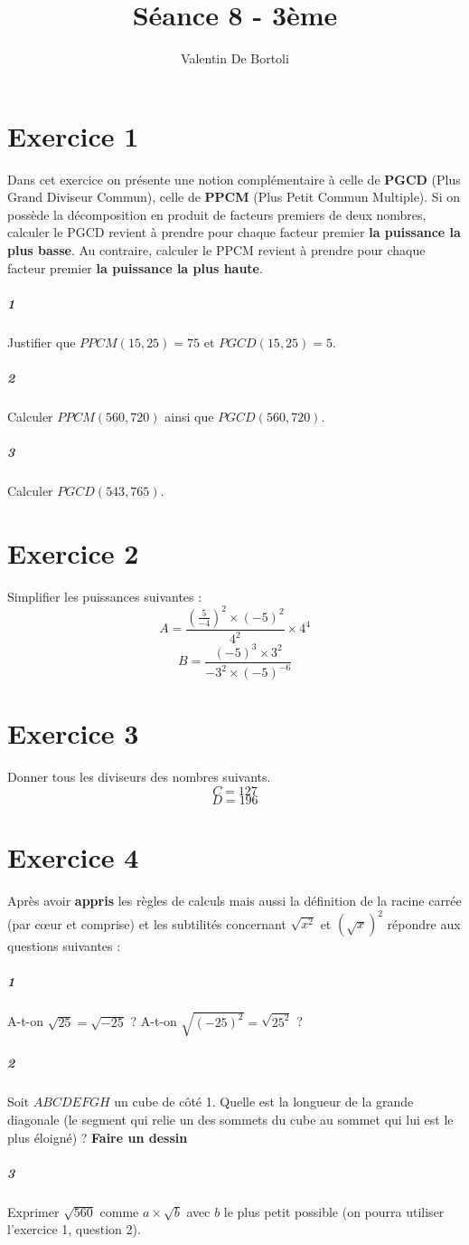 \documentclass[10pt,a4paper]{article}
\title{Séance 8 - 3ème}
\author{Valentin De Bortoli}
\begin{document}
\maketitle
\section{Exercice 1}
Dans cet exercice on présente une notion complémentaire à celle de \textbf{PGCD} (Plus Grand Diviseur Commun), celle de \textbf{PPCM} (Plus Petit Commun Multiple). Si on possède la décomposition en produit de facteurs premiers de deux nombres, calculer le PGCD revient à prendre pour chaque facteur premier \textbf{la puissance la plus basse}. Au contraire, calculer le PPCM revient à prendre pour chaque facteur premier \textbf{la puissance la plus haute}.
\subparagraph{1}Justifier que $PPCM(15,25)=75$ et $PGCD(15,25)=5$.
\subparagraph{2}Calculer $PPCM(560,720)$ ainsi que $PGCD(560,720)$.
\subparagraph{3}Calculer $PGCD(543,765)$.
\section{Exercice 2}
Simplifier les puissances suivantes :
\begin{equation}
A=\frac{\left(\frac{5}{-4}\right)^2 \times (-5)^2}{4^2}\times 4^4
\end{equation}
\begin{equation}
B=\frac{(-5)^3 \times 3^2}{-3^2 \times (-5)^{-6}}
\end{equation}
\section{Exercice 3}
Donner tous les diviseurs des nombres suivants.
\begin{equation}
C=127
\end{equation}
\begin{equation}
D=196
\end{equation}
\section{Exercice 4}
Après avoir \textbf{appris} les règles de calculs mais aussi la définition de la racine carrée (par cœur et comprise) et les subtilités concernant $\sqrt{x^2}$ et $(\sqrt{x})^2$ répondre aux questions suivantes :
\subparagraph{1} A-t-on $\sqrt{25}=\sqrt{-25}$ ? A-t-on $\sqrt{(-25)^2}=\sqrt{25^2}$ ?
\subparagraph{2} Soit $ABCDEFGH$ un cube de côté 1. Quelle est la longueur de la grande diagonale (le segment qui relie un des sommets du cube au sommet qui lui est le plus éloigné) ? \textbf{Faire un dessin}
\subparagraph{3} Exprimer $\sqrt{560}$ comme $a \times \sqrt{b}$ avec $b$ le plus petit possible (on pourra utiliser l'exercice 1, question 2).
\end{document}
